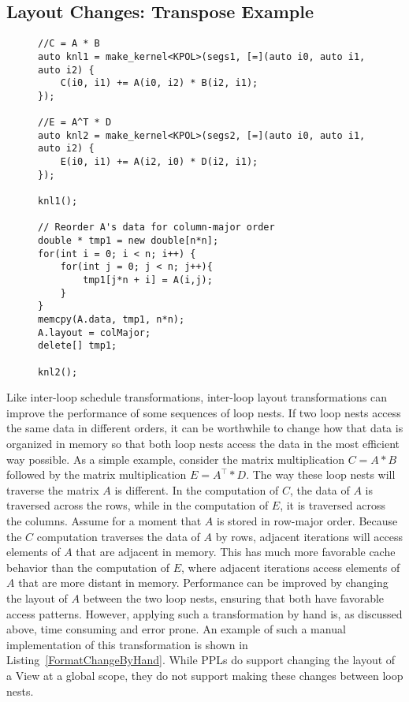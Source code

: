 \subsection{Layout Changes: Transpose Example}
\begin{figure}
\begin{lstlisting}[caption={Changing a View's data layout between computations by hand.},label={FormatChangeByHand}]
//C = A * B
auto knl1 = make_kernel<KPOL>(segs1, [=](auto i0, auto i1, auto i2) {
	C(i0, i1) += A(i0, i2) * B(i2, i1);
});

//E = A^T * D
auto knl2 = make_kernel<KPOL>(segs2, [=](auto i0, auto i1, auto i2) {
	E(i0, i1) += A(i2, i0) * D(i2, i1);
});

knl1();

// Reorder A's data for column-major order
double * tmp1 = new double[n*n];
for(int i = 0; i < n; i++) {
	for(int j = 0; j < n; j++){
		tmp1[j*n + i] = A(i,j);
	}
}
memcpy(A.data, tmp1, n*n);
A.layout = colMajor;
delete[] tmp1;

knl2();
\end{lstlisting}
\end{figure}
Like inter-loop schedule transformations, inter-loop layout transformations can improve the performance of some sequences of loop nests.
If two loop nests access the same data in different orders, it can be worthwhile to change how that data is organized in memory so that both loop nests access the data in the most efficient way possible.
As a simple example, consider the matrix multiplication $C = A * B$ followed by the matrix multiplication $E = A^{\top} * D$. 
The way these loop nests will traverse the matrix $A$ is different. 
In the computation of $C$, the data of $A$ is traversed across the rows, while in the computation of $E$, it is traversed across the columns.
Assume for a moment that $A$ is stored in row-major order.
Because the $C$ computation traverses the data of $A$ by rows, adjacent iterations will access elements of $A$ that are adjacent in memory.
This has much more favorable cache behavior than the computation of $E$, where adjacent iterations access elements of $A$ that are more distant in memory.
Performance can be improved by changing the layout of $A$ between the two loop nests, ensuring that both have favorable access patterns.
However, applying such a transformation by hand is, as discussed above, time consuming and error prone. 
An example of such a manual implementation of this transformation is shown in Listing~\ref{FormatChangeByHand}.
While PPLs do support changing the layout of a View at a global scope, they do not support making these changes between loop nests. 

